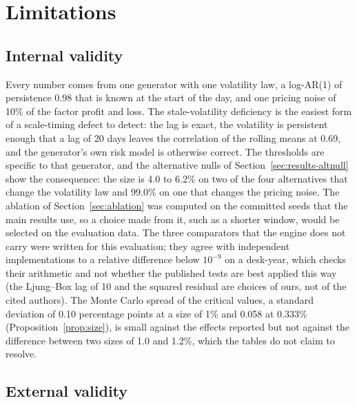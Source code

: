 \section{Limitations}
\label{sec:limitations}

\subsection{Internal validity}
\label{sec:limits-internal}

Every number comes from one generator with one volatility law, a log-AR(1) of persistence 0.98 that is known at the start of the day, and one pricing noise of 10\% of the factor profit and loss.
The stale-volatility deficiency is the easiest form of a scale-timing defect to detect: the lag is exact, the volatility is persistent enough that a lag of 20 days leaves the correlation of the rolling means at 0.69, and the generator's own risk model is otherwise correct.
The thresholds are specific to that generator, and the alternative nulls of Section~\ref{sec:results-altnull} show the consequence: the size is 4.0 to 6.2\% on two of the four alternatives that change the volatility law and 99.0\% on one that changes the pricing noise.
The ablation of Section~\ref{sec:ablation} was computed on the committed seeds that the main results use, so a choice made from it, such as a shorter window, would be selected on the evaluation data.
The three comparators that the engine does not carry were written for this evaluation; they agree with independent implementations to a relative difference below $10^{-9}$ on a desk-year, which checks their arithmetic and not whether the published tests are best applied this way (the Ljung--Box lag of 10 and the squared residual are choices of ours, not of the cited authors).
The Monte Carlo spread of the critical values, a standard deviation of 0.10 percentage points at a size of 1\% and 0.058 at 0.333\% (Proposition~\ref{prop:size}), is small against the effects reported but not against the difference between two sizes of 1.0 and 1.2\%, which the tables do not claim to resolve.

\subsection{External validity}
\label{sec:limits-external}

